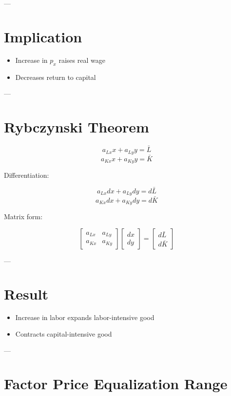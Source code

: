 ---

\section{Implication}

\begin{itemize}
    \item Increase in $p_x$ raises real wage
    \item Decreases return to capital
\end{itemize}

---

\section{Rybczynski Theorem}

\[
a_{Lx} x + a_{Ly} y = \bar{L}
\]
\[
a_{Kx} x + a_{Ky} y = \bar{K}
\]

Differentiation:

\[
a_{Lx} dx + a_{Ly} dy = d\bar{L}
\]
\[
a_{Kx} dx + a_{Ky} dy = d\bar{K}
\]

Matrix form:

\[
\begin{bmatrix}
a_{Lx} & a_{Ly} \\
a_{Kx} & a_{Ky}
\end{bmatrix}
\begin{bmatrix}
dx \\
dy
\end{bmatrix}
=
\begin{bmatrix}
d\bar{L} \\
d\bar{K}
\end{bmatrix}
\]

---

\section{Result}

\begin{itemize}
    \item Increase in labor expands labor-intensive good
    \item Contracts capital-intensive good
\end{itemize}

---

\section{Factor Price Equalization Range}

